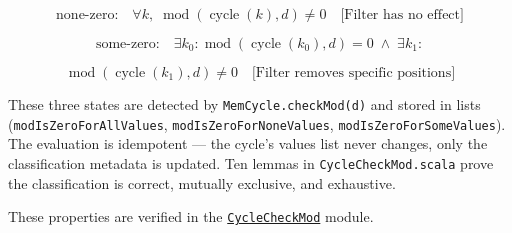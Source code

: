 \begin{equation*}
\text{none-zero:} \quad \forall k,\; \operatorname{mod}(\operatorname{cycle}(k), d) \neq 0
  \quad \text{[Filter has no effect]}
\end{equation*}

\begin{equation*}
\text{some-zero:} \quad \exists k_0 : \operatorname{mod}(\operatorname{cycle}(k_0), d) = 0
  \;\land\; \exists k_1 :
\end{equation*}

\begin{equation*}
\operatorname{mod}(\operatorname{cycle}(k_1), d) \neq 0
  \quad \text{[Filter removes specific positions]}
\end{equation*}

{\raggedright
These three states are detected by \texttt{MemCycle.checkMod(d)} and stored
in lists (\texttt{modIsZeroForAllValues}, \texttt{modIsZeroForNoneValues},
\texttt{modIsZeroForSomeValues}). The evaluation is idempotent --- the
cycle's values list never changes, only the classification metadata is
updated. Ten lemmas in \texttt{CycleCheckMod.scala} prove the classification
is correct, mutually exclusive, and exhaustive.
\par}

{\raggedright
These properties are verified in the
\href{https://github.com/thiagomata/prime-numbers/blob/integral-cycle-article-v1.0.0/src/main/scala/v1/chapter4/cycle/memory/properties/CycleCheckMod.scala}{\texttt{CycleCheckMod}}
module.
\par}
